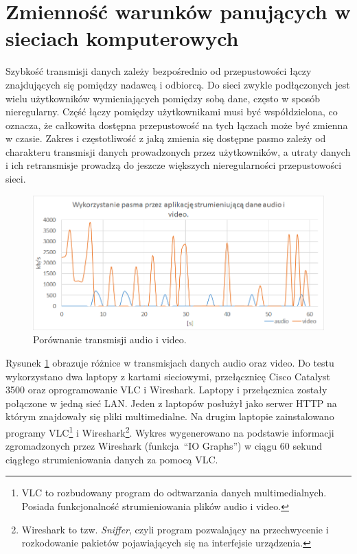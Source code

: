\section{Zmienność warunków panujących w sieciach komputerowych}

Szybkość transmisji danych zależy bezpośrednio od przepustowości łączy znajdujących się pomiędzy nadawcą i odbiorcą. Do sieci zwykle podłączonych jest wielu użytkowników wymieniających pomiędzy sobą dane, często w sposób nieregularny. Część łączy pomiędzy użytkownikami musi być współdzielona, co oznacza, że całkowita dostępna przepustowość na tych łączach może być zmienna w czasie. Zakres i częstotliwość z jaką zmienia się dostępne pasmo zależy od charakteru transmisji danych prowadzonych przez użytkowników, a utraty danych i ich retransmisje prowadzą do jeszcze większych nieregularności przepustowości sieci.

\begin{figure}[h!]
	\centering
		\includegraphics[width=\linewidth]{audiovideobitrate}
	\caption{Porównanie transmisji audio i video.}
	\label{fig:audiovideobitrate}
\end{figure}

Rysunek \ref{fig:audiovideobitrate} obrazuje różnice w transmisjach danych audio oraz video. Do testu wykorzystano dwa laptopy z kartami sieciowymi, przełącznicę Cisco Catalyst 3500 oraz oprogramowanie VLC i Wireshark. Laptopy i przełącznica zostały połączone w jedną sieć LAN.  Jeden z laptopów posłużył jako serwer HTTP na którym znajdowały się pliki multimedialne. Na drugim laptopie zainstalowano programy VLC\footnote{VLC to rozbudowany program do odtwarzania danych multimedialnych. Posiada funkcjonalność strumieniowania plików audio i video.} i Wireshark\footnote{Wireshark to tzw. \textit{Sniffer}, czyli program pozwalający na przechwycenie i rozkodowanie pakietów pojawiających się na interfejsie urządzenia.}. Wykres wygenerowano na podstawie informacji zgromadzonych przez Wireshark (funkcja~``IO Graphs'') w ciągu 60 sekund ciągłego strumieniowania danych za pomocą VLC.

